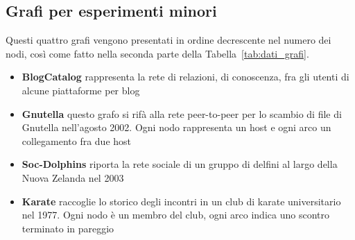 \subsection*{Grafi per esperimenti minori}
Questi quattro grafi vengono presentati in ordine decrescente nel numero dei nodi, così come fatto nella seconda parte della Tabella~\ref{tab:dati_grafi}.\\
\begin{itemize}
	\item \textbf{BlogCatalog}\cite{BlogCatalog} rappresenta la rete di relazioni, di conoscenza, fra gli utenti di alcune piattaforme per blog
	\item \textbf{Gnutella}\cite{Gnutella_1}\cite{Gnutella_2} questo grafo si rifà alla rete peer-to-peer per lo scambio di file di Gnutella nell'agosto 2002. Ogni nodo rappresenta un host e ogni arco un collegamento fra due host
	\item \textbf{Soc-Dolphins}\cite{Dolphins_1}\cite{Dolphins_2} riporta la rete sociale di un gruppo di delfini al largo della Nuova Zelanda nel 2003
	\item \textbf{Karate}\cite{Karate} raccoglie lo storico degli incontri in un club di karate universitario nel 1977. Ogni nodo è un membro del club, ogni arco indica uno scontro terminato in pareggio
\end{itemize}
%
%
%



%
